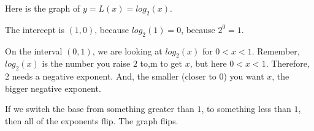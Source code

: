\documentclass{ximera}
\begin{document}
\begin{example}

Here is the graph of $y = L(x) = log_2(x)$.

\begin{image}
\end{image}


The intercept is $(1,0)$, because $log_2(1) = 0$, because $2^0 = 1$.

On the interval $(0,1)$, we are looking at $log_2(x)$ for $0<x<1$.  Remember, $log_2(x)$ is the number you raise $2$ to,m to get $x$, but here $0<x<1$.  Therefore, $2$ needs a negative exponent.  And, the smaller (closer to $0$) you want $x$, the bigger negative exponent.





\end{example}



If we switch the base from something greater than $1$, to something less than $1$, then all of the exponents flip.  The graph flips.
\end{document}
